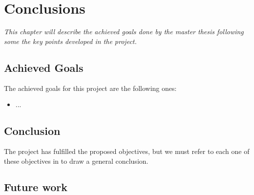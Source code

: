 \chapter{Conclusions}
\label{chap:conclusions}
\textit{This chapter will describe the achieved goals done by the master thesis following some the key points developed in the project.}

\clearpage
\section{Achieved Goals}

The achieved goals for this project are the following ones:

\begin{itemize}
    \item ...
\end{itemize}

\clearpage
\section{Conclusion}
\label{sec:conclusion}

The project has fulfilled the proposed objectives, but we must refer to each one of these objectives in to draw a general conclusion.

\section{Future work}

